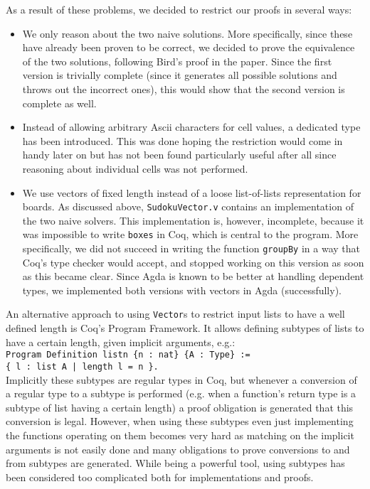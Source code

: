 \documentclass[a4paper,11pt]{article}
\begin{document}
As a result of these problems, we decided to restrict our proofs in several ways:
\begin{itemize}
  \item We only reason about the two naive solutions. More specifically, since these have already been proven to be correct, we decided to prove the equivalence of the two solutions, following Bird's proof in the paper. Since the first version is trivially complete (since it generates all possible solutions and throws out the incorrect ones), this would show that the second version is complete as well.
  \item Instead of allowing arbitrary Ascii characters for cell values, a dedicated type has been introduced. This was done hoping the restriction would come in handy later on but has not been found particularly useful after all since reasoning about individual cells was not performed.
  \item We use vectors of fixed length instead of a loose list-of-lists representation for boards. As discussed above, \texttt{SudokuVector.v} contains an implementation of the two naive solvers. This implementation is, however, incomplete, because it was impossible to write \texttt{boxes} in Coq, which is central to the program. More specifically, we did not succeed in writing the function \texttt{groupBy} in a way that Coq's type checker would accept, and stopped working on this version as soon as this became clear. Since Agda is known to be better at handling dependent types, we implemented both versions with vectors in Agda (successfully). 
\end{itemize} 

An alternative approach to using \texttt{Vector}s to restrict input lists to have a well defined length is Coq's Program Framework. It allows defining subtypes of lists to have a certain length, given implicit arguments, e.g.:\\
  \texttt{Program Definition listn \{n : nat\} \{A : Type\} :=\\
    \{ l : list A | length l = n \}.}\\
  Implicitly these subtypes are regular types in Coq, but whenever a conversion of a regular type to a subtype is performed (e.g. when a function's return type is a subtype of list having a certain length) a proof obligation is generated that this conversion is legal. However, when using these subtypes even just implementing the functions operating on them becomes very hard as matching on the implicit arguments is not easily done and many obligations to prove conversions to and from subtypes are generated. While being a powerful tool, using subtypes has been considered too complicated both for implementations and proofs.
\end{document}
